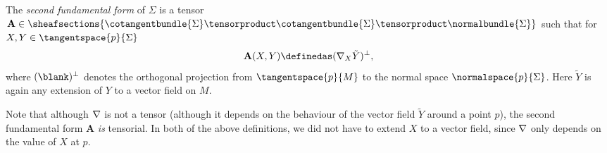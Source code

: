 \documentclass[titlepage,numbers=noenddot,oneside,%
cleardoublepage=empty,paper=a4,fontsize=11pt,%
english,%
]{scrartcl}
\begin{document}
{\begin{definition}
    The \emph{second fundamental form} of \( \Sigma \) is a tensor \( \mathbf{A}\in \sheafsections{\cotangentbundle{\Sigma}\tensorproduct \cotangentbundle{\Sigma}\tensorproduct \normalbundle{\Sigma}} \) such that for \( X,Y\in \tangentspace{p}{\Sigma} \)
    \begin{equation*}
        \mathbf{A}(X,Y)\definedas (\Mconnection_X \tilde{Y})^\perp,
    \end{equation*}
    where \( (\blank)^\perp \) denotes the orthogonal projection from \( \tangentspace{p}{M} \) to the normal space \( \normalspace{p}{\Sigma} \). Here \( \tilde{Y} \) is again any extension of \( Y \) to a vector field on \( M \).
\end{definition}  
Note that although \( \nabla \) is not a tensor (\ie although it depends on the behaviour of the vector field \( \tilde{Y} \) around a point \( p \)), the second fundamental form \( \mathbf{A} \) \emph{is} tensorial. In both of the above definitions, we did not have to extend \( X \) to a vector field, since \( \nabla \) only depends on the value of \( X \) at \( p \).

}
\end{document}
